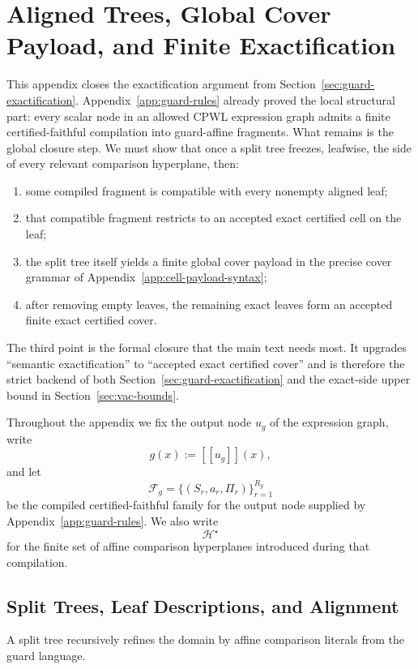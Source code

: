 \section{Aligned Trees, Global Cover Payload, and Finite Exactification}
\label{app:exactification}

This appendix closes the exactification argument from Section~\ref{sec:guard-exactification}. Appendix~\ref{app:guard-rules} already proved the local structural part: every scalar node in an allowed CPWL expression graph admits a finite certified-faithful compilation into guard-affine fragments. What remains is the global closure step. We must show that once a split tree freezes, leafwise, the side of every relevant comparison hyperplane, then:
\begin{enumerate}
    \item some compiled fragment is compatible with every nonempty aligned leaf;
    \item that compatible fragment restricts to an accepted exact certified cell on the leaf;
    \item the split tree itself yields a finite global cover payload in the precise cover grammar of Appendix~\ref{app:cell-payload-syntax};
    \item after removing empty leaves, the remaining exact leaves form an accepted finite exact certified cover.
\end{enumerate}

The third point is the formal closure that the main text needs most. It upgrades ``semantic exactification'' to ``accepted exact certified cover'' and is therefore the strict backend of both Section~\ref{sec:guard-exactification} and the exact-side upper bound in Section~\ref{sec:vac-bounds}.

Throughout the appendix we fix the output node $u_g$ of the expression graph, write
\[
 g(x):=[[u_g]](x),
\]
and let
\[
 \mathcal F_g=\{(S_r,a_r,\Pi_r)\}_{r=1}^{R_g}
\]
be the compiled certified-faithful family for the output node supplied by Appendix~\ref{app:guard-rules}. We also write
\[
 \mathcal H^\star
\]
for the finite set of affine comparison hyperplanes introduced during that compilation.

\subsection{Split Trees, Leaf Descriptions, and Alignment}

A split tree recursively refines the domain by affine comparison literals from the guard language.

